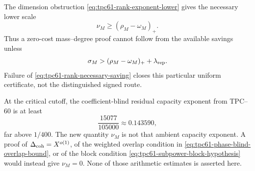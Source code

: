 The dimension obstruction
\eqref{eq:tpc61-rank-exponent-lower} gives the necessary lower scale
\[
 \nu_M\ge(\rho_M-\omega_M)_+.
\]
Thus a zero-cost mass--degree proof cannot follow from the available
savings unless
\begin{equation}
 \sigma_M>
 (\rho_M-\omega_M)_++\lambda_{\rm rep}.
 \label{eq:tpc61-rank-necessary-saving}
\end{equation}
Failure of \eqref{eq:tpc61-rank-necessary-saving} closes this particular
uniform certificate, not the distinguished signed route.

At the critical cutoff, the coefficient-blind residual capacity exponent
from TPC--60 is at least
\[
 \frac{15077}{105000}
 \approx0.143590,
\]
far above \(1/400\).  The new quantity \(\nu_M\) is not that ambient
capacity exponent.  A proof of
\(\Delta_{\rm coh}=X^{o(1)}\), of the weighted overlap condition in
\eqref{eq:tpc61-phase-blind-overlap-bound}, or of the block condition
\eqref{eq:tpc61-subpower-block-hypothesis} would instead give
\(\nu_M=0\).  None of those arithmetic estimates is asserted here.
